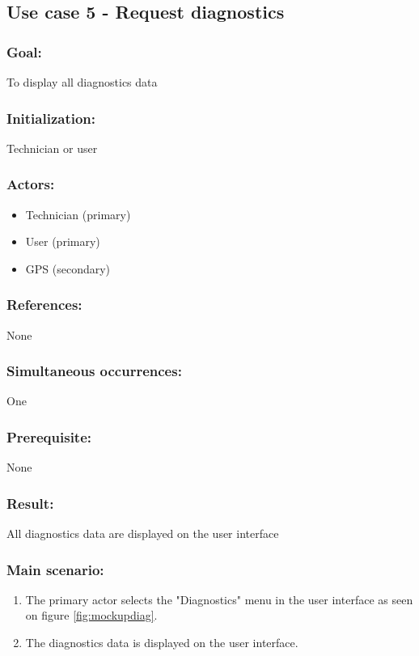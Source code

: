\begin{framed}
	\subsection{Use case 5 - Request diagnostics}
	\subsubsection*{Goal:}
	To display all diagnostics data
	
	\subsubsection*{Initialization:}
	Technician or user
	
	\subsubsection*{Actors:}
	\begin{itemize}
		\item Technician (primary)
		\item User (primary)
		\item GPS (secondary)
	\end{itemize}
	
	\subsubsection*{References:}
	None
	
	\subsubsection*{Simultaneous occurrences:}
	One
	
	\subsubsection*{Prerequisite:}
	None
	
	\subsubsection*{Result:}
	All diagnostics data are displayed on the user interface
	
	\subsubsection*{Main scenario:}
	\begin{enumerate}
		\item The primary actor selects the "Diagnostics" menu in the user interface as seen on figure \ref{fig:mockupdiag}.
		\item The diagnostics data is displayed on the user interface. 
	\end{enumerate}
\end{framed}



